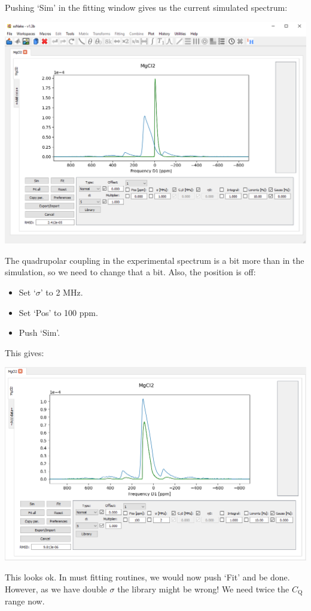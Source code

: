\documentclass[11pt,a4paper]{article}
\begin{document}
Pushing `Sim' in the fitting window gives us the current simulated spectrum:
\begin{center}
\includegraphics[width=0.8\linewidth]{Figs/fig4.PNG}
\end{center}

The quadrupolar coupling in the experimental spectrum is a bit more than in the simulation, so we need to change that a bit. Also, the position is off:
\begin{itemize}
  \item Set `$\sigma$' to 2 MHz.
  \item Set `Pos' to 100 ppm.
  \item Push `Sim'.
\end{itemize}
This gives:
\begin{center}
\includegraphics[width=0.8\linewidth]{Figs/fig5.PNG}
\end{center}
This looks ok. In must fitting routines, we would now push `Fit' and be done. However, as we have double $\sigma$ the library might be wrong! We need twice the $C_\text{Q}$ range now.
\end{document}
